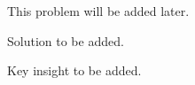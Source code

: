 
\begin{problem}
This problem will be added later.
\end{problem}

\begin{solution}
Solution to be added.
\end{solution}

\begin{takeaways}
\item Key insight to be added.
\end{takeaways}
